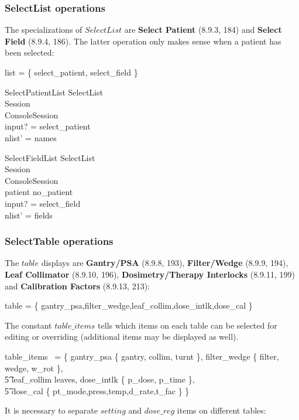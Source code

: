 \subsubsection{SelectList operations}

The specializations of $SelectList$ are {\bf Select Patient}
(8.9.3, 184) and {\bf Select Field} (8.9.4, 186).  The latter
operation only makes sense when a patient has been selected:

\begin{zed} list = \{ select\_patient, select\_field \} \end{zed}

\begin{schema}{SelectPatientList}
	SelectList \\
	\Xi Session \\
	\Delta ConsoleSession \\
\where
	input? = select\_patient \\
	nlist' = names 
\end{schema}

\begin{schema}{SelectFieldList}
	SelectList \\
	\Xi Session \\
	\Delta ConsoleSession \\
\where
	patient \neq no\_patient \\
	input? = select\_field \\
	nlist' = \dom fields
\end{schema}

\subsubsection{SelectTable operations}

The $table$ displays are {\bf Gantry/PSA} (8.9.8, 193), 
{\bf Filter/Wedge} (8.9.9, 194), {\bf Leaf Collimator} (8.9.10, 196), 
{\bf Dosimetry/Therapy Interlocks} (8.9.11, 199) and 
{\bf Calibration Factors} (8.9.13, 213):

\begin{zed}
table = \{ gantry\_psa,filter\_wedge,leaf\_collim,dose\_intlk,dose\_cal \}
\end{zed}
The constant $table\_items$ tells which items on each table can be
selected for editing or overriding (additional items may be displayed as
well).

\begin{zed}
	table\_items~ = \{ gantry\_psa \mapsto \{ gantry, collim, turnt \}, filter\_wedge \mapsto \{ filter, wedge, w\_rot \}, \\
\t5			leaf\_collim \mapsto leaves, dose\_intlk \mapsto \{ p\_dose, p\_time \}, \\
\t5		dose\_cal \mapsto\{ pt\_mode,press,temp,d\_rate,t\_fac \} \}
\end{zed}
It is necessary to separate $setting$ and $dose\_reg$ items on
different tables:

